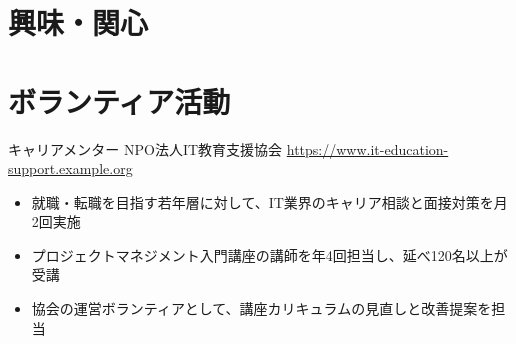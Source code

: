 \documentclass[a4paper, serif, 10pt]{moderncv}
\begin{document}
\section{興味・関心}

\section{ボランティア活動}

        {キャリアメンター}
        {NPO法人IT教育支援協会}
        {\url{https://www.it-education-support.example.org}}
        {}
        {\begin{itemize}
\item 就職・転職を目指す若年層に対して、IT業界のキャリア相談と面接対策を月2回実施
\item プロジェクトマネジメント入門講座の講師を年4回担当し、延べ120名以上が受講
\item 協会の運営ボランティアとして、講座カリキュラムの見直しと改善提案を担当
\end{itemize}}
    
\end{document}
